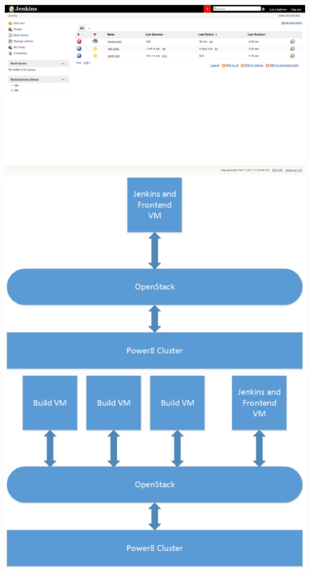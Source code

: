 \documentclass[10pt,onecolumn,journal,draftclsnofoot]{IEEEtran}
\begin{document}
\includegraphics[width=\textwidth, keepaspectratio]{jenkins.eps}
\includegraphics[width=\textwidth, keepaspectratio]{Current_Infrastructure.eps}
\includegraphics[width=\textwidth, keepaspectratio]{Infrastructure.eps}
\end{document}
